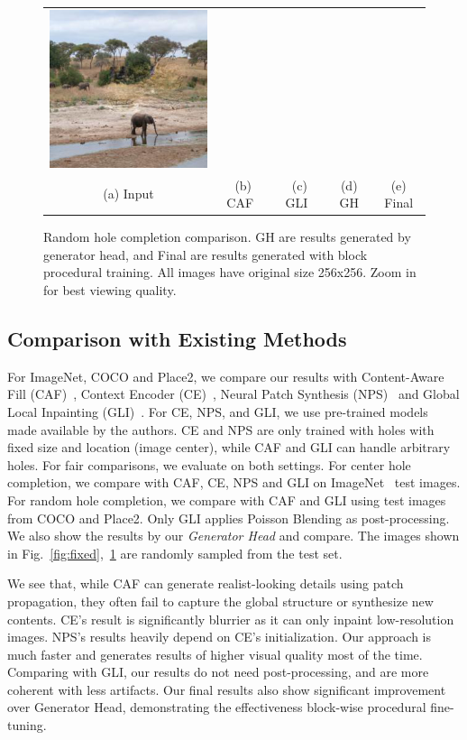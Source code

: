 \begin{figure}[!ht]
\begin{tabular}{ccccc}
\includegraphics[width=.2\textwidth]{figures/random/000000286994.jpg}\\
(a) Input & (b) CAF~\cite{barnes2009patchmatch} & (c) GLI~\cite{iizuka2017globally} & (d) GH & (e) Final \\
\end{tabular}
\caption{Random hole completion comparison. GH are results generated by generator head, and Final are results generated with block procedural training. All images have original size 256x256. Zoom in for best viewing quality.}
\label{fig:random}
\end{figure}

\subsection{Comparison with Existing Methods}
\label{exp:comparison}
For ImageNet, COCO and Place2, we compare our results with Content-Aware Fill (CAF)~\cite{barnes2009patchmatch}, Context Encoder (CE)~\cite{pathak2016context}, Neural Patch Synthesis (NPS)~\cite{yang2017high} and Global Local Inpainting (GLI)~\cite{iizuka2017globally}. For CE, NPS, and GLI, we use pre-trained models made available by the authors. CE and NPS are only trained with holes with fixed size and location (image center), while CAF and GLI can handle arbitrary holes. For fair comparisons, we evaluate on both settings. For center hole completion, we compare with CAF, CE, NPS and GLI on ImageNet~\cite{russakovsky2015imagenet} test images. For random hole completion, we compare with CAF and GLI using test images from COCO and Place2. Only GLI applies Poisson Blending as post-processing. We also show the results by our \textit{Generator Head} and compare. The images shown in Fig.~\ref{fig:fixed},~\ref{fig:random} are randomly sampled from the test set. 

We see that, while CAF can generate realist-looking details using patch propagation, they often fail to capture the global structure or synthesize new contents. CE's result is significantly blurrier as it can only inpaint low-resolution images. NPS's results heavily depend on CE's initialization. Our approach is much faster and generates results of higher visual quality most of the time. Comparing with GLI, our results do not need post-processing, and are more coherent with less artifacts. Our final results also show significant improvement over Generator Head, demonstrating the effectiveness block-wise procedural fine-tuning.

